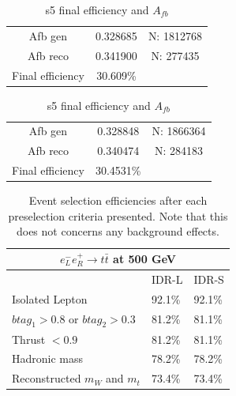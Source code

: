 \documentclass[preprint]{elsarticle}
\begin{document}
\begin{table}[h!]
    \parbox{.45\linewidth}{
    \centering
    \begin{tabular}{ccc}
      \hline
      \hline
      	Afb gen				&	0.328685		&	N: 1812768	\\
      	Afb reco			&	0.341900		&	N: 277435		\\
      	Final efficiency	&	30.609\%		&	\\			
      \hline
      \hline
    \end{tabular}
    \caption{l5 final efficiency and $A_{fb}$}
    }
    \hfill
    \parbox{.45\linewidth}{
    \centering
    \begin{tabular}{ccc}
      \hline
      \hline
        Afb gen				&	0.328848		&	N: 1866364	\\
      	Afb reco			&	0.340474		&	N: 284183		\\
      	Final efficiency	&	30.4531\%	&						\\	
      \hline
      \hline
  \end{tabular}
  \caption{s5 final efficiency and $A_{fb}$}
  \label{tab:tt-eff}
  }
  
  \end{table}

  \begin{table}[t]
    \begin{center}\renewcommand{\arraystretch}{1.6}
      \begin{tabular}{l|l|l} 
      \multicolumn{3}{c}{$e_{L}^{-}e_{R}^{+}\rightarrow t\bar{t}$ at 500 GeV }\\
        \hline
        \hline
         															& IDR-L & IDR-S\\
        \hline
        Isolated Lepton   									& 92.1\% & 92.1\% \\
        $btag_{1} > 0.8$ or $btag_{2} > 0.3$    	& 81.2\% & 81.1\% \\
        Thrust $< 0.9$   									& 81.2\% & 81.1\% \\
        Hadronic mass										& 78.2\% & 78.2\% \\
        Reconstructed $m_W$ and $m_t$			& 73.4\% & 73.4\% \\
        \hline
        \hline     
      \end{tabular}
   \end{center}
   \caption{Event selection efficiencies after each preselection criteria presented. Note that this does not concerns any background effects.}
   \label{table_precut_eff}
  \end{table}
\end{document}
